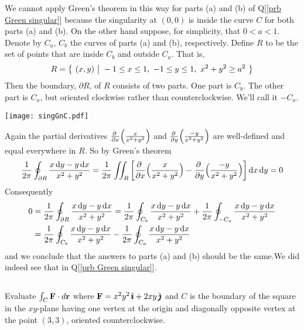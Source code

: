 \begin{solution}
We cannot apply Green's theorem
in this way for parts (a) and (b) of Q[\ref{prb Green singular}] because
the singularity at $(0,0)$ is inside the curve $C$ for both parts 
(a) and (b). On the other hand suppose, for simplicity, that $0<a<1$. 
Denote by $C_a$, $C_b$ the curves of parts (a) and (b),
respectively. Define $R$ to be the set of points that are inside $C_b$  
and outside $C_a$. That is,
\begin{equation*}
R=\Set{(x,y)}{-1\le x \le 1,\ -1\le y\le 1,\ x^2+y^2\ge a^2 }
\end{equation*}
Then the boundary, $\partial R$, of $R$ consists of two parts. 
One part is $C_b$.
The other part is $C_a$, but oriented clockwise rather than
counterclockwise. We'll call it $-C_a$.
\begin{center}
       \texttt{[image: singGnC.pdf]}
\end{center}
Again the partial derivatives 
$\pdiff{}{x}\Big( \frac{x}{x^2+y^2}\Big)$
and
$\pdiff{}{y}\Big( \frac{-y}{x^2+y^2}\Big)$
are well-defined and equal everywhere in $R$. So by Green's theorem
\begin{equation*}
\frac{1}{2\pi}\oint_{\partial R} \frac{x\,\dee{y}-y\,\dee{x}}{x^2+y^2}
=\frac{1}{2\pi}\dblInt_R\left[
   \pdiff{}{x}\Big( \frac{x}{x^2+y^2}\Big)
 -\pdiff{}{y}\Big( \frac{-y}{x^2+y^2}\Big)\right]\dee{x}\, \dee{y} 
=0
\end{equation*}
Consequently
\begin{align*}
0 &= \frac{1}{2\pi}\oint_{\partial R} \frac{x\,\mathrm{d}y-y\,\mathrm{d}x}{x^2+y^2}
= \frac{1}{2\pi}\oint_{C_b} \frac{x\,\mathrm{d}y-y\,\mathrm{d}x}{x^2+y^2}
+ \frac{1}{2\pi}\oint_{-C_a} \frac{x\,\mathrm{d}y-y\,\mathrm{d}x}{x^2+y^2}
\\
&=\frac{1}{2\pi}\oint_{C_b} \frac{x\,\mathrm{d}y-y\,\mathrm{d}x}{x^2+y^2}
- \frac{1}{2\pi}\oint_{C_a} \frac{x\,\mathrm{d}y-y\,\mathrm{d}x}{x^2+y^2}
\end{align*} 
and we conclude that the answers to parts (a) and (b) should be
the same.We did indeed see that in Q[\ref{prb Green singular}].
\end{solution}



\subsection*{\Procedural}

\begin{question}
Evaluate   $\int_C\mathbf{F}\cdot d\mathbf{r}$ where 
$\mathbf{F} = x^2y^2\,\hat{\pmb{\imath}} + 2xy\,\hat{\pmb{\jmath}}$ and $C$ is the boundary of the square in the 
$xy$-plane having one vertex at the origin and diagonally opposite vertex at the point $(3, 3)$, oriented counterclockwise.
\end{question}

